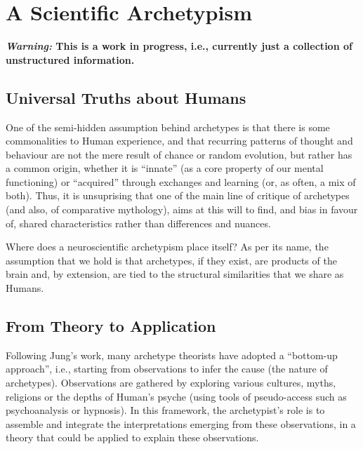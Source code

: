 \documentclass[
]{book}
\begin{document}
\hypertarget{a-scientific-archetypism}{%
\chapter{A Scientific Archetypism}\label{a-scientific-archetypism}}

\textbf{\emph{Warning:} This is a work in progress, i.e., currently just a collection of unstructured information.}

\hypertarget{universal-truths-about-humans}{%
\section{Universal Truths about Humans}\label{universal-truths-about-humans}}

One of the semi-hidden assumption behind archetypes is that there is some commonalities to Human experience, and that recurring patterns of thought and behaviour are not the mere result of chance or random evolution, but rather has a common origin, whether it is ``innate'' (as a core property of our mental functioning) or ``acquired'' through exchanges and learning (or, as often, a mix of both). Thus, it is unsuprising that one of the main line of critique of archetypes (and also, of comparative mythology), aims at this will to find, and bias in favour of, shared characteristics rather than differences and nuances.

Where does a neuroscientific archetypism place itself? As per its name, the assumption that we hold is that archetypes, if they exist, are products of the brain and, by extension, are tied to the structural similarities that we share as Humans.

\hypertarget{from-theory-to-application}{%
\section{From Theory to Application}\label{from-theory-to-application}}

Following Jung's work, many archetype theorists have adopted a ``bottom-up approach'', i.e., starting from observations to infer the cause (the nature of archetypes). Observations are gathered by exploring various cultures, myths, religions or the depths of Human's psyche (using tools of pseudo-access such as psychoanalysis or hypnosis). In this framework, the archetypist's role is to assemble and integrate the interpretations emerging from these observations, in a theory that could be applied to explain these observations.
\end{document}

